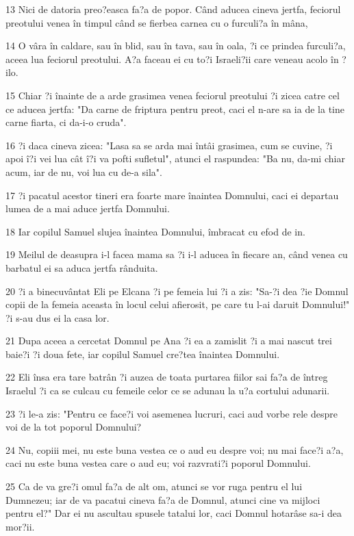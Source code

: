 \par 13 Nici de datoria preo?easca fa?a de popor. Când aducea cineva jertfa, feciorul preotului venea în timpul când se fierbea carnea cu o furculi?a în mâna,
\par 14 O vâra în caldare, sau în blid, sau în tava, sau în oala, ?i ce prindea furculi?a, aceea lua feciorul preotului. A?a faceau ei cu to?i Israeli?ii care veneau acolo în ?ilo.
\par 15 Chiar ?i înainte de a arde grasimea venea feciorul preotului ?i zicea catre cel ce aducea jertfa: "Da carne de friptura pentru preot, caci el n-are sa ia de la tine carne fiarta, ci da-i-o cruda".
\par 16 ?i daca cineva zicea: "Lasa sa se arda mai întâi grasimea, cum se cuvine, ?i apoi î?i vei lua cât î?i va pofti sufletul", atunci el raspundea: "Ba nu, da-mi chiar acum, iar de nu, voi lua cu de-a sila".
\par 17 ?i pacatul acestor tineri era foarte mare înaintea Domnului, caci ei departau lumea de a mai aduce jertfa Domnului.
\par 18 Iar copilul Samuel slujea înaintea Domnului, îmbracat cu efod de in.
\par 19 Meilul de deasupra i-l facea mama sa ?i i-l aducea în fiecare an, când venea cu barbatul ei sa aduca jertfa rânduita.
\par 20 ?i a binecuvântat Eli pe Elcana ?i pe femeia lui ?i a zis: "Sa-?i dea ?ie Domnul copii de la femeia aceasta în locul celui afierosit, pe care tu l-ai daruit Domnului!" ?i s-au dus ei la casa lor.
\par 21 Dupa aceea a cercetat Domnul pe Ana ?i ea a zamislit ?i a mai nascut trei baie?i ?i doua fete, iar copilul Samuel cre?tea înaintea Domnului.
\par 22 Eli însa era tare batrân ?i auzea de toata purtarea fiilor sai fa?a de întreg Israelul ?i ca se culcau cu femeile celor ce se adunau la u?a cortului adunarii.
\par 23 ?i le-a zis: "Pentru ce face?i voi asemenea lucruri, caci aud vorbe rele despre voi de la tot poporul Domnului?
\par 24 Nu, copiii mei, nu este buna vestea ce o aud eu despre voi; nu mai face?i a?a, caci nu este buna vestea care o aud eu; voi razvrati?i poporul Domnului.
\par 25 Ca de va gre?i omul fa?a de alt om, atunci se vor ruga pentru el lui Dumnezeu; iar de va pacatui cineva fa?a de Domnul, atunci cine va mijloci pentru el?" Dar ei nu ascultau spusele tatalui lor, caci Domnul hotarâse sa-i dea mor?ii.
